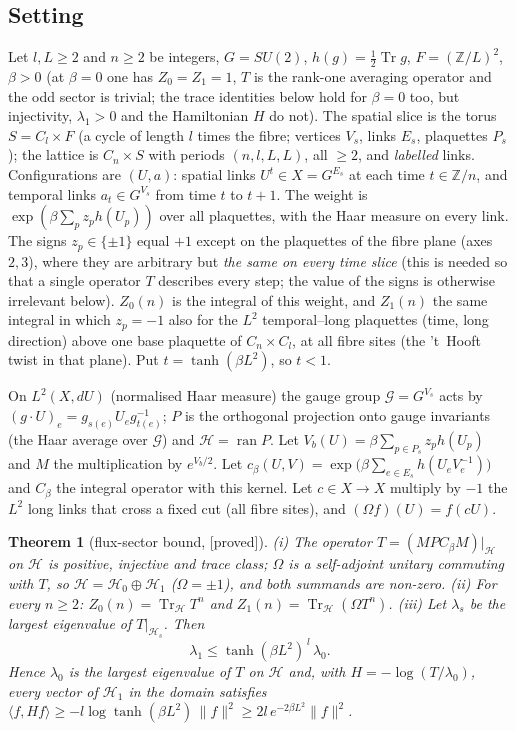 \documentclass[11pt,a4paper]{article}
\theoremstyle{plain}
\newtheorem{theorem}{Theorem}[section]
\theoremstyle{definition}
\theoremstyle{remark}
\numberwithin{equation}{section}
\newcommand{\Z}{\mathbb{Z}}
\newcommand{\Tr}{\operatorname{Tr}}
\newcommand{\st}[1]{\textsf{[#1]}}
\begin{document}
\subsection{Setting}
Let $l,L\ge2$ and $n\ge2$ be integers, $G=SU(2)$, $h(g)=\frac12\Tr g$, $F=(\Z/L)^2$, $\beta>0$ (at $\beta=0$ one has $Z_0=Z_1=1$, $T$ is the rank-one averaging operator and the odd sector is trivial; the trace identities below hold for $\beta=0$ too, but injectivity, $\lambda_1>0$ and the Hamiltonian $H$ do not). The spatial slice is the torus $S=C_l\times F$ (a cycle of length $l$ times the fibre; vertices $V_s$, links $E_s$, plaquettes $P_s$); the lattice is $C_n\times S$ with periods $(n,l,L,L)$, all $\ge2$, and \emph{labelled} links. Configurations are $(U,a)$: spatial links $U^t\in X=G^{E_s}$ at each time $t\in\Z/n$, and temporal links $a_t\in G^{V_s}$ from time $t$ to $t+1$. The weight is $\exp(\beta\sum_pz_ph(U_p))$ over all plaquettes, with the Haar measure on every link. The signs $z_p\in\{\pm1\}$ equal $+1$ except on the plaquettes of the fibre plane (axes $2,3$), where they are arbitrary but \emph{the same on every time slice} (this is needed so that a single operator $T$ describes every step; the value of the signs is otherwise irrelevant below). $Z_0(n)$ is the integral of this weight, and $Z_1(n)$ the same integral in which $z_p=-1$ also for the $L^2$ temporal--long plaquettes (time, long direction) above one base plaquette of $C_n\times C_l$, at all fibre sites (the 't~Hooft twist in that plane). Put $t=\tanh(\beta L^2)$, so $t<1$.

On $L^2(X,dU)$ (normalised Haar measure) the gauge group $\mathcal G=G^{V_s}$ acts by $(g\cdot U)_e=g_{s(e)}U_eg_{t(e)}^{-1}$; $P$ is the orthogonal projection onto gauge invariants (the Haar average over $\mathcal G$) and $\mathcal H=\operatorname{ran}P$. Let $V_b(U)=\beta\sum_{p\in P_s}z_ph(U_p)$ and $M$ the multiplication by $e^{V_b/2}$. Let $c_\beta(U,V)=\exp\bigl(\beta\sum_{e\in E_s}h(U_eV_e^{-1})\bigr)$ and $C_\beta$ the integral operator with this kernel. Let $c\in X\to X$ multiply by $-1$ the $L^2$ long links that cross a fixed cut (all fibre sites), and $(\Omega f)(U)=f(cU)$.

\begin{theorem}[flux-sector bound, \st{proved}]\label{thm:flux}
(i) The operator $T=(MPC_\beta M)|_{\mathcal H}$ on $\mathcal H$ is positive, injective and trace class; $\Omega$ is a self-adjoint unitary commuting with $T$, so $\mathcal H=\mathcal H_0\oplus\mathcal H_1$ ($\Omega=\pm1$), and both summands are non-zero. (ii) For every $n\ge2$: $Z_0(n)=\Tr_{\mathcal H}T^n$ and $Z_1(n)=\Tr_{\mathcal H}(\Omega T^n)$. (iii) Let $\lambda_s$ be the largest eigenvalue of $T|_{\mathcal H_s}$. Then
\[
\lambda_1\le\tanh(\beta L^2)^{\,l}\,\lambda_0 .
\]
Hence $\lambda_0$ is the largest eigenvalue of $T$ on $\mathcal H$ and, with $H=-\log(T/\lambda_0)$, every vector of $\mathcal H_1$ in the domain satisfies $\langle f,Hf\rangle\ge-l\log\tanh(\beta L^2)\,\|f\|^2\ge2l\,e^{-2\beta L^2}\|f\|^2$.
\end{theorem}
\end{document}
